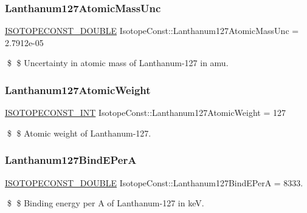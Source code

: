 \subsubsection{\texorpdfstring{Lanthanum127\+Atomic\+Mass\+Unc}{Lanthanum127AtomicMassUnc}}
{\footnotesize\ttfamily \mbox{\hyperlink{group___isotope_const-_macros_ga8f45a7272ce02c0b4c65c44636ed719a}{I\+S\+O\+T\+O\+P\+E\+C\+O\+N\+S\+T\+\_\+\+D\+O\+U\+B\+LE}} Isotope\+Const\+::\+Lanthanum127\+Atomic\+Mass\+Unc = 2.\+7912e-\/05}

\$ \$ Uncertainty in atomic mass of Lanthanum-\/127 in amu. \mbox{\label{group___isotope_const-_lanthanum-_la127_ga62db72c2bf9cc9e4b039368a4be8bbab}} 
\subsubsection{\texorpdfstring{Lanthanum127\+Atomic\+Weight}{Lanthanum127AtomicWeight}}
{\footnotesize\ttfamily \mbox{\hyperlink{group___isotope_const-_macros_ga5f18360b3e99483a35c32d789e62621c}{I\+S\+O\+T\+O\+P\+E\+C\+O\+N\+S\+T\+\_\+\+I\+NT}} Isotope\+Const\+::\+Lanthanum127\+Atomic\+Weight = 127}

\$ \$ Atomic weight of Lanthanum-\/127. \mbox{\label{group___isotope_const-_lanthanum-_la127_gaa418f5b18fcdf62307879571ddeff398}} 
\subsubsection{\texorpdfstring{Lanthanum127\+Bind\+E\+PerA}{Lanthanum127BindEPerA}}
{\footnotesize\ttfamily \mbox{\hyperlink{group___isotope_const-_macros_ga8f45a7272ce02c0b4c65c44636ed719a}{I\+S\+O\+T\+O\+P\+E\+C\+O\+N\+S\+T\+\_\+\+D\+O\+U\+B\+LE}} Isotope\+Const\+::\+Lanthanum127\+Bind\+E\+PerA = 8333.}

\$ \$ Binding energy per A of Lanthanum-\/127 in keV. \mbox{\label{group___isotope_const-_lanthanum-_la127_ga65b1f88c03d03fb7fbff34cc0551c950}} 
